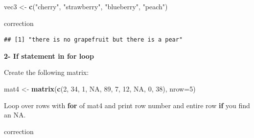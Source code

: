 \documentclass[]{book}
\newenvironment{Shaded}{\begin{snugshade}}{\end{snugshade}}
\newcommand{\ControlFlowTok}[1]{\textcolor[rgb]{0.13,0.29,0.53}{\textbf{#1}}}
\newcommand{\DataTypeTok}[1]{\textcolor[rgb]{0.13,0.29,0.53}{#1}}
\newcommand{\DecValTok}[1]{\textcolor[rgb]{0.00,0.00,0.81}{#1}}
\newcommand{\KeywordTok}[1]{\textcolor[rgb]{0.13,0.29,0.53}{\textbf{#1}}}
\newcommand{\NormalTok}[1]{#1}
\newcommand{\OperatorTok}[1]{\textcolor[rgb]{0.81,0.36,0.00}{\textbf{#1}}}
\newcommand{\OtherTok}[1]{\textcolor[rgb]{0.56,0.35,0.01}{#1}}
\newcommand{\StringTok}[1]{\textcolor[rgb]{0.31,0.60,0.02}{#1}}
\begin{document}
\begin{Shaded}
\begin{Highlighting}[]
\NormalTok{vec3 <-}\StringTok{ }\KeywordTok{c}\NormalTok{(}\StringTok{"cherry"}\NormalTok{, }\StringTok{"strawberry"}\NormalTok{, }\StringTok{"blueberry"}\NormalTok{, }\StringTok{"peach"}\NormalTok{)}
\end{Highlighting}
\end{Shaded}

correction

\begin{Shaded}
\end{Shaded}

\begin{verbatim}
## [1] "there is no grapefruit but there is a pear"
\end{verbatim}

\textbf{2- If statement in for loop}

Create the following matrix:

\begin{Shaded}
\begin{Highlighting}[]
\NormalTok{mat4 <-}\StringTok{ }\KeywordTok{matrix}\NormalTok{(}\KeywordTok{c}\NormalTok{(}\DecValTok{2}\NormalTok{, }\DecValTok{34}\NormalTok{, }\DecValTok{1}\NormalTok{, }\OtherTok{NA}\NormalTok{, }\DecValTok{89}\NormalTok{, }\DecValTok{7}\NormalTok{, }\DecValTok{12}\NormalTok{, }\OtherTok{NA}\NormalTok{, }\DecValTok{0}\NormalTok{, }\DecValTok{38}\NormalTok{),}
    \DataTypeTok{nrow=}\DecValTok{5}\NormalTok{)}
\end{Highlighting}
\end{Shaded}

Loop over rows with \textbf{for} of mat4 and print row number and entire row \textbf{if} you find an NA.

correction
\end{document}
